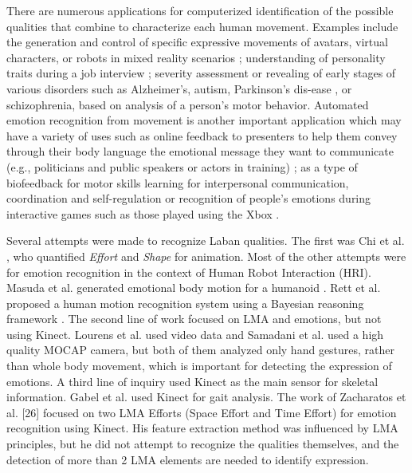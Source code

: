\documentclass{sigchi}
\begin{document}
\mbox{}
\par
There are numerous applications for computerized identification of
the possible qualities that combine to characterize each human
movement. Examples include the generation and control of specific
expressive movements of avatars, virtual characters, or robots in
mixed reality scenarios \cite{Masuda}; understanding of personality traits during a job interview \cite{levy2003use}; severity assessment or revealing of early stages of various disorders such as Alzheimer's, autism, Parkinson's dis-ease \cite{camurri2003application}, or schizophrenia, based on analysis
of a person's motor behavior. Automated emotion recognition from
movement is another important application which may have a
variety of uses such as online feedback to presenters to
help them convey through their body language
the emotional message they want to
communicate (e.g., politicians and public
speakers or actors in training) \cite{nguyen2012online}; as a type of biofeedback for motor skills learning for interpersonal communication,
coordination and self-regulation or recognition of people's emotions during interactive games such as those
played using the Xbox \cite{Zacharatos}.
\mbox{}\\
\par
Several attempts were made to recognize Laban qualities. The first was Chi
et al. \cite{chi2000emote}, who quantified \textit{Effort} and \textit{Shape} for animation.
Most of the other attempts were for emotion recognition in the context of Human Robot Interaction (HRI).
Masuda et al. generated emotional body motion for a humanoid \cite{Masuda}.
Rett et al. proposed a human motion recognition system using a Bayesian reasoning framework \cite{Rett}.
The second line of work focused on LMA and emotions, but not using Kinect.
Lourens et al. \cite{lourens2010communicating} used video data and Samadani et al.
\cite{samadani2013laban} used a high quality MOCAP camera, but both of them
analyzed only hand gestures, rather than whole body movement, which is important for detecting the expression of emotions. A third line of inquiry used Kinect as the main sensor for skeletal information. Gabel et al. \cite{gabel2012full} used Kinect for gait analysis. 
The work of Zacharatos et al. [26] focused on two LMA Efforts (Space Effort and Time Effort) for emotion recognition using Kinect. His feature extraction method was influenced by LMA principles, but he did not attempt to recognize the qualities themselves, and the detection of more than 2 LMA elements are needed to identify expression.
\end{document}
